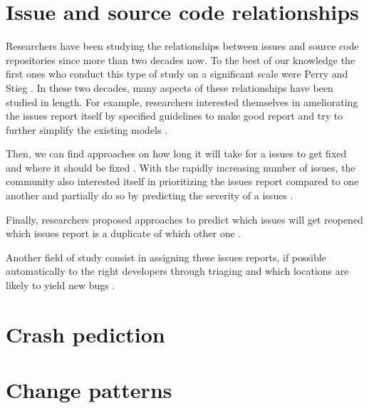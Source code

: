\section{Issue and source code relationships\label{rel:issue-rela}}

Researchers have been studying the relationships between issues and source code repositories since more than two decades now. 
To the best of our knowledge the first ones who conduct this type of study on a significant scale were Perry and Stieg \cite{PerryDewayneE.1993}. 
In these two decades, many aspects of these relationships have been studied in length.
For example, researchers  interested themselves in ameliorating the issues report itself by specified guidelines to make good report \cite{Bettenburg2008} and try to further simplify the existing models \cite{Herraiz2008}. 

Then, we can find approaches on how long it will take for a issues to get fixed \cite{Bhattacharya2011,Zhang2013,Saha2014} and where it should be fixed \cite{Zhou2012,Kim2013a}.
With the rapidly increasing number of issues, the community also interested itself in prioritizing the issues report compared to one another \cite{Kim2011c} and partially do so by predicting the severity of a issues \cite{Lamkanfi2010}.

Finally, researchers proposed approaches to predict which issues will get reopened \cite{Zimmermann2012,Lo2013} which issues report is a duplicate of which other one \cite{Jalbert2008,Bettenburg2008a,Tian2012a}.

Another field of study consist in assigning these issues reports, if possible automatically to the right developers through triaging  \cite{Anvik2006,Jeong2009,Tamrawi2011a,Bortis2013} 
and which locations are likely to yield new bugs \cite{Kim2006,Kim2007}.

\section{Crash pediction}


\section{Change patterns}

